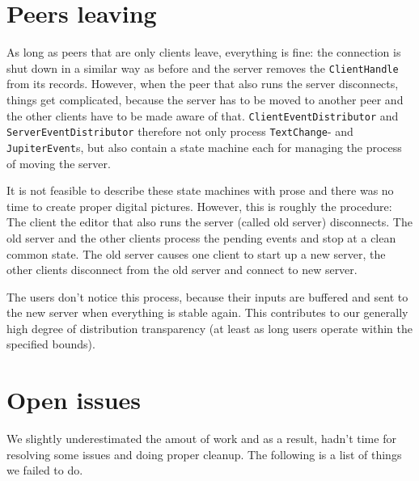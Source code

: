 \documentclass[a4paper,final,12pt,oneside,article,table]{memoir}
\newcommand{\mil}[1]{\texttt{#1}}
\begin{document}
\chapter{Peers leaving}

As long as peers that are only clients leave, everything is fine: the
connection is shut down in a similar way as before and the server
removes the \mil{ClientHandle} from its records. However, when the peer
that also runs the server disconnects, things get complicated, because
the server has to be moved to another peer and the other clients have to
be made aware of that. \mil{ClientEventDistributor} and
\mil{ServerEventDistributor} therefore not only process
\mil{TextChange}- and \mil{JupiterEvent}s, but also contain a state
machine each for managing the process of moving the server.

It is not feasible to describe these state machines with prose and there
was no time to create proper digital pictures. However, this is roughly
the procedure: The client the editor that also runs the server (called
old server) disconnects. The old server and the other clients process
the pending events and stop at a clean common state. The old server
causes one client to start up a new server, the other clients disconnect
from the old server and connect to new server.

The users don't notice this process, because their inputs are buffered
and sent to the new server when everything is stable again. This
contributes to our generally high degree of distribution transparency
(at least as long users operate within the specified bounds).

\chapter{Open issues}
\label{sec:notime}

We slightly underestimated the amout of work and as a result, hadn't
time for resolving some issues and doing proper cleanup. The following
is a list of things we failed to do.
\end{document}
